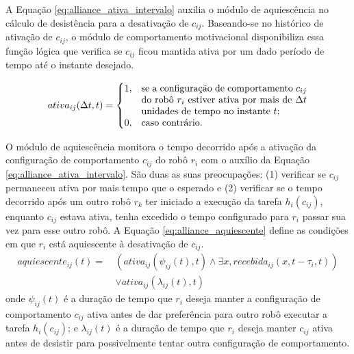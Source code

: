         A Equação \ref{eq:alliance_ativa_intervalo} auxilia o módulo de aquiescência no cálculo de desistência para a desativação de $c_{ij}$. Baseando-se no histórico de ativação de $c_{ij}$, o módulo de comportamento motivacional disponibiliza essa função lógica que verifica se $c_{ij}$ ficou mantida ativa por um dado período de tempo até o instante desejado.
        
        \begin{equation} \label{eq:alliance_ativa_intervalo}
            ativa_{ij}(\Delta t, t) =
            \begin{cases}
                1, & \parbox[t]{.5\textwidth}{se a configuração de comportamento $c_{ij}$ do robô $r_i$ estiver ativa por mais de $\Delta t$ unidades de tempo no instante $t$;} \\
                0, & \text{caso contrário.}
            \end{cases}
        \end{equation}
        
        O módulo de aquiescência monitora o tempo decorrido após a ativação da configuração de comportamento $c_{ij}$ do robô $r_i$ com o auxílio da Equação \ref{eq:alliance_ativa_intervalo}. São duas as suas preocupações: (1) verificar se $c_{ij}$ permaneceu ativa por mais tempo que o esperado e (2) verificar se o tempo decorrido após um outro robô $r_k$ ter iniciado a execução da tarefa $h_i(c_{ij})$, enquanto $c_{ij}$ estava ativa, tenha excedido o tempo configurado para $r_i$ passar sua vez para esse outro robô. A Equação \ref{eq:alliance_aquiescente} define as condições em que $r_i$ está aquiescente à desativação de $c_{ij}$.
        \begin{equation} \label{eq:alliance_aquiescente}
            \begin{aligned}
                aquiescente_{ij}(t) = \
                & (ativa_{ij}(\psi_{ij}(t), t) \land \exists x, recebida_{ij}(x, t - \tau_i, t)) \\
                & \lor ativa_{ij}(\lambda_{ij}(t), t)
            \end{aligned}
        \end{equation}
        onde $\psi_{ij}(t)$ é a duração de tempo que $r_i$ deseja manter a configuração de comportamento $c_{ij}$ ativa antes de dar preferência para outro robô executar a tarefa $h_i(c_{ij})$; e $\lambda_{ij}(t)$ é a duração de tempo que $r_i$ deseja manter $c_{ij}$ ativa antes de desistir para possivelmente tentar outra configuração de comportamento.
        
